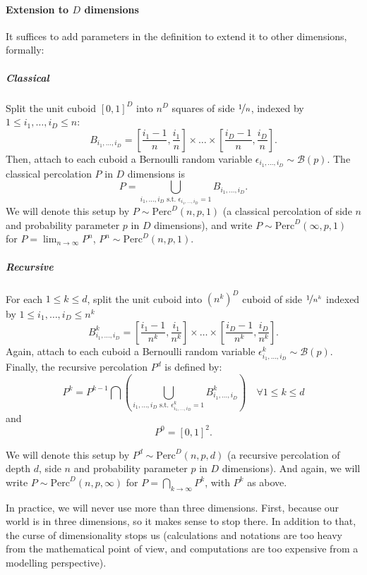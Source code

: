 \paragraph{Extension to $D$ dimensions}
It suffices to add parameters in the definition to extend it to other dimensions, formally:

\subparagraph{Classical}
Split the unit cuboid $\left[ 0,1 \right]^D$ into $n^D$ squares of side $\nicefrac{1}{n}$, indexed by $1 \leq i_1,\dots,i_D \leq n$:
$$B_{i_1,\dots,i_D} = \left[ \frac{i_1-1}{n}, \frac{i_1}{n} \right] \times \dots \times \left[ \frac{i_D-1}{n}, \frac{i_D}{n} \right].$$
Then, attach to each cuboid a Bernoulli random variable $\epsilon_{i_1,\dots,i_D} \sim \mathcal{B}(p)$.
The classical percolation $P$ in $D$ dimensions is
$$P = \bigcup_{i_1,\dots,i_D \text{ s.t. } \epsilon_{i_1,\dots,i_D}=1} B_{i_1,\dots,i_D}.$$
We will denote this setup by $P \sim \text{Perc}^D(n,p,1)$ (a classical percolation of side $n$ and probability parameter $p$ in $D$ dimensions), and write $P \sim \text{Perc}^D(\infty,p,1)$ for $P = \lim_{n \to \infty} P^n$, $P^n \sim \text{Perc}^D(n,p,1)$.

\subparagraph{Recursive}
For each $1 \leq k \leq d$, split the unit cuboid into $\left( n^k \right)^D$ cuboid of side $\nicefrac{1}{n^k}$ indexed by $1 \leq i_1,\dots,i_D \leq n^k$
$$B_{i_1,\dots,i_D}^k = \left[ \frac{i_1-1}{n^k},\frac{i_1}{n^k} \right] \times \dots \times \left[ \frac{i_D-1}{n^k},\frac{i_D}{n^k} \right].$$
Again, attach to each cuboid a Bernoulli random variable $\epsilon_{i_1,\dots,i_D}^k \sim \mathcal{B}(p)$.
Finally, the recursive percolation $P^d$ is defined by:
$$P^k = P^{k-1} \bigcap \left( \bigcup_{i_1,\dots,i_D \text{ s.t. } \epsilon_{i_1,\dots,i_D}^k = 1} B_{i_1,\dots,i_D}^k \right) \quad \forall 1 \leq k \leq d$$
and $$P^0 = \left[ 0,1 \right]^2.$$

We will denote this setup by $P^d \sim \text{Perc}^D(n,p,d)$ (a recursive percolation of depth $d$, side $n$ and probability parameter $p$ in $D$ dimensions).
And again, we will write $P \sim \text{Perc}^D(n,p,\infty)$ for $P  = \bigcap_{k \to \infty} P^k$, with $P^k$ as above.

In practice, we will never use more than three dimensions.
First, because our world is in three dimensions, so it makes sense to stop there.
In addition to that, the curse of dimensionality\cite{WikiDimCurse} stops us (calculations and notations are too heavy from the mathematical point of view, and computations are too expensive from a modelling perspective).



